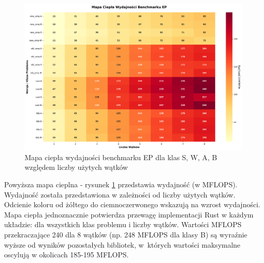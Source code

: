 \begin{figure}[H]
    \centering
    \includegraphics[width=\textwidth]{analiza/images/parallel/ep/arm/ep_mapa_ciepla_wydajnosci.png}
    \caption{Mapa ciepła wydajności benchmarku EP dla klas S, W, A, B względem liczby użytych wątków}
    \label{ep_heatmap_wydajnosci}
\end{figure}
Powyższa mapa cieplna - rysunek \ref{ep_heatmap_wydajnosci} przedstawia wydajność (w MFLOPS). Wydajność została przedstawiona w zależności od liczby użytych wątków. Odcienie koloru od żółtego do ciemnoczerwonego wskazują na wzrost wydajności.\\
Mapa ciepła jednoznacznie potwierdza przewagę implementacji Rust w każdym układzie: dla wszystkich klas problemu i liczby wątków. Wartości MFLOPS przekraczające 240 dla 8 wątków (np. 248 MFLOPS dla klasy B) są wyraźnie wyższe od wyników pozostałych bibliotek, w~których wartości maksymalne oscylują w okolicach 185-195 MFLOPS.



